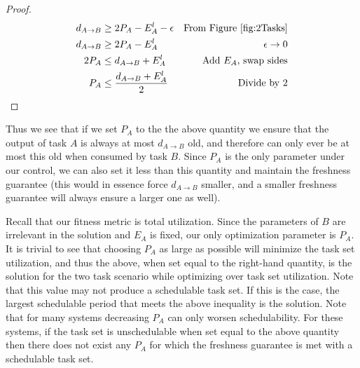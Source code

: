 \begin{proof}
	\begin{align*}
		d_{A \to B}&\geq 2P_A-E^l_A-\epsilon &\mbox{From Figure \ref{fig:2Tasks}}&\\
		d_{A \to B}&\geq 2P_A-E^l_A &\mbox{$\epsilon \to 0$}&\\
		2P_A&\leq d_{A \to B} + E^l_A &\mbox{Add $E_A$, swap sides}&\\
		P_A&\leq \frac{d_{A \to B} + E^l_A}{2} &\mbox{Divide by 2}&\\
	\end{align*}
\end{proof}

Thus we see that if we set $P_A$ to the the above quantity we ensure that the output of task $A$ is always at most $d_{A \to B}$ old, and therefore can only ever be at most this old when consumed by task $B$. Since $P_A$ is the only parameter under our control, we can also set it less than this quantity and maintain the freshness guarantee (this would in essence force $d_{A \to B}$ smaller, and a smaller freshness guarantee will always ensure a larger one as well).

Recall that our fitness metric is total utilization. Since the parameters of $B$ are irrelevant in the solution and $E_A$ is fixed, our only optimization parameter is $P_A$. It is trivial to see that choosing $P_A$ as large as possible will minimize the task set utilization, and thus the above, when set equal to the right-hand quantity, is the solution for the two task scenario while optimizing over task set utilization. Note that this value may not produce a schedulable task set. If this is the case, the largest schedulable period that meets the above inequality is the solution. Note that for many systems decreasing $P_A$ can only worsen schedulability. For these systems, if the task set is unschedulable when set equal to the above quantity then there does not exist any $P_A$ for which the freshness guarantee is met with a schedulable task set.
